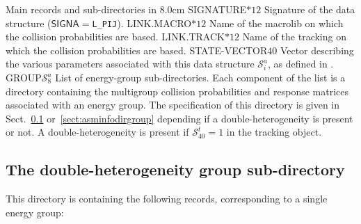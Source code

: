 \begin{DescriptionEnregistrement}{Main records and sub-directories in }{8.0cm}
\CharEnr
  {SIGNATURE}{$*12$}
  {Signature of the data structure ($\mathsf{SIGNA}=${\tt L\_PIJ}).}
\CharEnr
  {LINK.MACRO}{$*12$}
  {Name of the {\sc macrolib} on which the collision probabilities are based.}
\CharEnr
  {LINK.TRACK}{$*12$}
  {Name of the {\sc tracking} on which the collision probabilities are based.}
\IntEnr
  {STATE-VECTOR}{$40$}
  {Vector describing the various parameters associated with this data structure $\mathcal{S}^{a}_{i}$,
  as defined in .}
\DirlEnr
  {GROUP}{$\mathcal{S}^{a}_{8}$}
  {List of energy-group sub-directories. Each component of the list is a directory containing
  the multigroup collision probabilities and response matrices associated with an energy group.
  The specification of this directory is given in Sect.~\ref{sect:asminfodhdirgroup} or~\ref{sect:asminfodirgroup}
  depending if a double-heterogeneity is present or not. A double-heterogeneity is present if $\mathcal{S}^{t}_{40}=1$
  in the {\sc tracking} object.}
\end{DescriptionEnregistrement}

\clearpage

\subsection{The  double-heterogeneity group sub-directory}\label{sect:asminfodhdirgroup}

This directory is containing the following records, corresponding to a single energy group:

